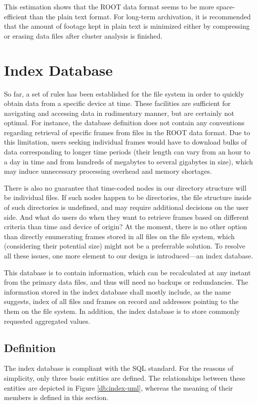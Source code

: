 This estimation shows that the ROOT data format seems to be more space-efficient than the plain text format. For long-term archivation, it is recommended that the amount of footage kept in plain text is minimized either by compressing or erasing data files after cluster analysis is finished.

\section{Index Database}
So far, a set of rules has been established for the file system in order to quickly obtain data from a specific device at time. These facilities are sufficient for navigating and accessing data in rudimentary manner, but are certainly not optimal. For instance, the database definition does not contain any conventions regarding retrieval of specific frames from files in the ROOT data format. Due to this limitation, users seeking individual frames would have to download bulks of data corresponding to longer time periods (their length can vary from an hour to a day in time and from hundreds of megabytes to several gigabytes in size), which may induce unnecessary processing overhead and memory shortages.

There is also no guarantee that time-coded nodes in our directory structure will be individual files. If such nodes happen to be directories, the file structure inside of such directories is undefined, and may require additional decisions on the user side. And what do users do when they want to retrieve frames based on different criteria than time and device of origin? At the moment, there is no other option than directly enumerating frames stored in all files on the file system, which (considering their potential size) might not be a preferrable solution. To resolve all these issues, one more element to our design is introduced---an index database.

This database is to contain information, which can be recalculated at any instant from the primary data files, and thus will need no backups or redundancies. The information stored in the index database shall mostly include, as the name suggests, index of all files and frames on record and addresses pointing to the them on the file system. In addition, the index database is to store commonly requested aggregated values.

\subsection{Definition}
The index database is compliant with the SQL standard. For the reasons of simplicity, only three basic entities are defined. The relationships between these entities are depicted in Figure \ref{db:index-uml}, whereas the meaning of their members is defined in this section.

